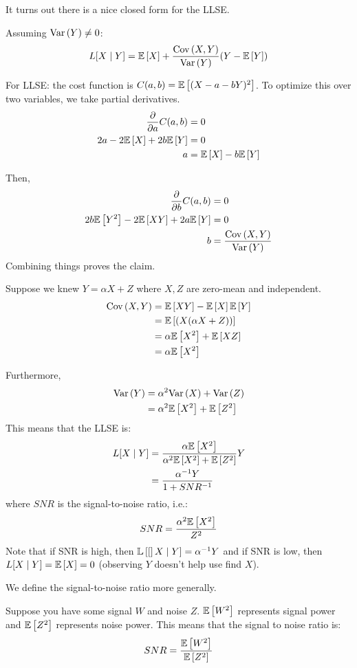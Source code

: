 It turns out there is a nice closed form for the LLSE.
\begin{theorem}
    Assuming $\text{Var}\left( Y \right) \neq 0$:
    \[ L[X \mid Y] = \mathbb{E}\left[ X \right] + \frac{\text{Cov}\left( X, Y \right)}{\text{Var}\left( Y \right)} (Y - \mathbb{E}\left[ Y \right]) \]

    \begin{proof*}
        For LLSE: the cost function is $C(a, b) = \mathbb{E}\left[ (X - a - bY)^2 \right]$.
        To optimize this over two variables, we take partial derivatives.
        \begin{align*}
            \frac{\partial}{\partial a} C(a, b) &= 0 \\
            2a - 2 \mathbb{E}\left[ X \right] + 2b \mathbb{E}\left[ Y \right] &= 0 \\
            a &= \mathbb{E}\left[ X \right] - b \mathbb{E}\left[ Y \right]
        \end{align*}

        Then,
        \begin{align*}
            \frac{\partial}{\partial b} C(a, b) &= 0 \\
            2b \mathbb{E}\left[ Y^2 \right] - 2 \mathbb{E}\left[ XY \right] + 2a \mathbb{E}\left[ Y \right] &= 0 \\
            b &= \frac{\text{Cov}\left( X, Y \right)}{\text{Var}\left( Y \right)}
        \end{align*}
        Combining things proves the claim.
    \end{proof*}
\end{theorem}

\begin{example}
    Suppose we knew $Y = \alpha X + Z$ where $X,Z$ are zero-mean and independent.
    \begin{align*}
        \text{Cov}\left( X, Y \right) &= \mathbb{E}\left[ XY \right] - \mathbb{E}\left[ X \right]\mathbb{E}\left[ Y \right] \\
        &= \mathbb{E}\left[ (X(\alpha X + Z)) \right] \\
        &= \alpha \mathbb{E}\left[ X^2 \right] + \mathbb{E}\left[ XZ \right] \\
        &= \alpha \mathbb{E}\left[ X^2 \right]
    \end{align*}

    Furthermore,
    \begin{align*}
        \text{Var}\left( Y \right) &= \alpha^2 \text{Var}\left( X \right) + \text{Var}\left( Z \right) \\
        &= \alpha^2 \mathbb{E}\left[ X^2 \right] + \mathbb{E}\left[ Z^2 \right] \\
    \end{align*}
    This means that the LLSE is:
    \begin{align*}
        L[X \mid Y] &= \frac{\alpha \mathbb{E}\left[ X^2 \right]}{\alpha^2 \mathbb{E}\left[ X^2 \right] + \mathbb{E}\left[ Z^2 \right]} Y \\
        &= \frac{\alpha^{-1} Y}{1 + SNR^{-1}}
    \end{align*}
    where $SNR$ is the signal-to-noise ratio, i.e.:
    \[ SNR = \frac{\alpha^2 \mathbb{E}\left[ X^2 \right]}{Z^2} \]
    Note that if SNR is high, then $\mathbb{L}\left[ [ \right]X \mid Y] = \alpha^{-1} Y$ and if SNR is low, then $L[X \mid Y] = \mathbb{E}\left[ X \right] = 0$ (observing $Y$ doesn't help use find $X$).
\end{example}

We define the signal-to-noise ratio more generally.

\begin{definition}
    Suppose you have some signal $W$ and noise $Z$. $\mathbb{E}\left[ W^2 \right]$ represents signal power and $\mathbb{E}\left[ Z^2 \right]$ represents noise power.
    This means that the signal to noise ratio is:
    \[ SNR = \frac{\mathbb{E}\left[ W^2 \right]}{\mathbb{E}\left[ Z^2 \right]} \]
\end{definition}